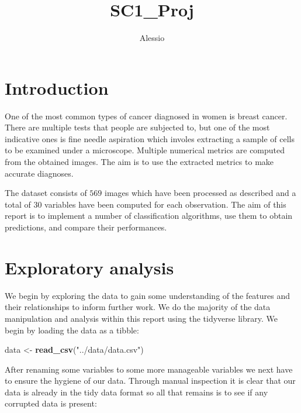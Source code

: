 \documentclass[]{article}
\title{SC1\_Proj}
\author{Alessio}
\date{}
\newenvironment{Shaded}{\begin{snugshade}}{\end{snugshade}}
\newcommand{\KeywordTok}[1]{\textcolor[rgb]{0.13,0.29,0.53}{\textbf{#1}}}
\newcommand{\StringTok}[1]{\textcolor[rgb]{0.31,0.60,0.02}{#1}}
\newcommand{\NormalTok}[1]{#1}
\begin{document}
\maketitle

\newcommand{\vect}[1]{\boldsymbol{\mathbf{#1}}}
\newcommand{\vbeta}{\vect{\beta}}
\newcommand{\vx}{\vect{x}}
\newcommand{\vy}{\vect{y}}
\newcommand{\vzero}{\vect{0}}
\newcommand{\vSigma}{\vect{\Sigma}}
\newcommand{\vtheta}{\vect{\theta}}
\newcommand{\uniform}{\mathcal{U}(0, 1)}






\section{Introduction}\label{introduction}

One of the most common types of cancer diagnosed in women is breast
cancer. There are multiple tests that people are subjected to, but one
of the most indicative ones is fine needle aspiration which involes
extracting a sample of cells to be examined under a microscope. Multiple
numerical metrics are computed from the obtained images. The aim is to
use the extracted metrics to make accurate diagnoses.

The dataset consists of \(569\) images which have been processed as
described and a total of \(30\) variables have been computed for each
observation. The aim of this report is to implement a number of
classification algorithms, use them to obtain predictions, and compare
their performances.

\section{Exploratory analysis}\label{exploratory-analysis}

We begin by exploring the data to gain some understanding of the
features and their relationships to inform further work. We do the
majority of the data manipulation and analysis within this report using
the tidyverse library. We begin by loading the data as a tibble:

\begin{Shaded}
\begin{Highlighting}[]
\NormalTok{data <-}\StringTok{ }\KeywordTok{read_csv}\NormalTok{(}\StringTok{"../data/data.csv"}\NormalTok{)}
\end{Highlighting}
\end{Shaded}

After renaming some variables to some more manageable variables we next
have to ensure the hygiene of our data. Through manual inspection it is
clear that our data is already in the tidy data format so all that
remains is to see if any corrupted data is present:
\end{document}
